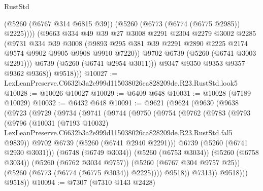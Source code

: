 \begin{lexlean}{RustStd}
\begin{coremodule}
                    (@5260 (@6767 @314 @6815 @39))
                    (@5260 (@6773 (@6774 (@6775 @2985)) @2225))))
                (@9663
                  @334
                  @49
                  @39
                  @27
                  @3008
                  @2291
                  @2304
                  @2279
                  @3002
                  @2285
                  (@9731
                    @334
                    @39
                    @3008
                    (@9893
                      @295
                      @381
                      @39
                      @2291
                      @2890
                      @2225
                      @2174
                      @9574
                      @9902
                      @9905
                      @9908
                      @9910
                      @7220))
                  @9702
                  @6739
                  (@5260 (@6741 @3003 @2291)))
                @6739
                (@5260 (@6741 @2954 @3011)))
              @9347
              @9350
              @9353
              @9357
              @9362
              @9368))
          @9518)))
@10027 := LexLeanPreserve.C6632b3a2e999d115038026ca828209de.R23.RustStd.look5
@10028 := @10026 @10027
@10029 := @6409 @648
@10031 := @10028 (@7189 @10029)
@10032 := @6432 @648
@10091 := @9621
    (@9624
      (@9630
        (@9638
          (@9723
            (@9729
              (@9734
                (@9741
                  (@9744
                    (@9750
                      (@9754
                        (@9762
                          (@9783
                            (@9793
                              (@9796
                                (@10031
                                  (@7193 @10032)
                                  LexLeanPreserve.C6632b3a2e999d115038026ca828209de.R23.RustStd.fal5
                                  @9839))
                              @9702
                              @6739
                              (@5260 (@6741 @2940 @2291)))
                            @6739
                            (@5260 (@6741 @2930 @3031)))
                          (@6748 (@6749 @3034))
                          (@5260 (@6753 @3034))
                          (@5260 (@6758 @3034))
                          (@5260 (@6762 @3034 @9757))
                          (@5260 (@6767 @304 @9757 @25))
                          (@5260 (@6773 (@6774 (@6775 @3034)) @2225))))
                      @9518))
                  @7313))
              @9518)))
        @9518))
@10094 := @7307 (@7310 @143 @2428)

\end{coremodule}
\end{lexlean}
